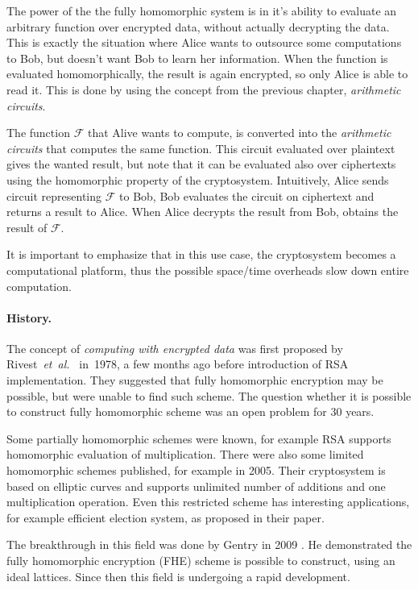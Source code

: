 \documentclass[11pt,oneside,final]{fithesis2}
\newcommand{\eal}{\emph{et~al.}}
\begin{document}
    The power of the the fully homomorphic system is in it's ability to evaluate an arbitrary function over 
    encrypted data, without actually decrypting the data. This is exactly the situation where Alice wants to outsource some computations
    to Bob, but doesn't want Bob to learn her information. When the function is evaluated homomorphically, the result is again encrypted,
    so only Alice is able to read it. This is done by using the concept from the previous chapter, \emph{arithmetic circuits}.

    The function $\mathcal{F}$ that Alive wants to compute, is converted into the \emph{arithmetic circuits} that computes the same function. This circuit evaluated
    over plaintext gives the wanted result, but note that it can be evaluated also over ciphertexts using the homomorphic property of
    the cryptosystem. Intuitively, Alice sends circuit representing $\mathcal{F}$ to Bob, Bob evaluates the circuit on ciphertext and returns a result to Alice.
    When Alice decrypts the result from Bob, obtains the result of $\mathcal{F}$.

    It is important to emphasize that in this use case, the cryptosystem becomes a computational platform, thus the possible space/time overheads slow down entire computation.
        
    \paragraph*{History.} 

    The concept of \emph{computing with encrypted data} was first proposed by Rivest~\eal~\citep{Rivest1978} in~1978, a few months ago 
    before introduction of RSA implementation. They suggested that fully homomorphic encryption may be possible, but were unable to find 
    such scheme. The question whether it is possible to construct fully homomorphic scheme was an open problem for 30 years.
    
    Some partially homomorphic schemes were known, for example RSA supports homomorphic evaluation of multiplication. 
    There were also some limited homomorphic schemes published, for example \citep{Boneh:2005:EFC:2140004.2140029} in 2005. 
    Their cryptosystem is based on elliptic curves and supports unlimited number of additions and one multiplication operation. Even this restricted 
    scheme has interesting applications, for example efficient election system, as proposed in their paper.
    
    The breakthrough in this field was done by Gentry in 2009 \citep{Gentry:2009:FHE:1536414.1536440}. He demonstrated the fully 
    homomorphic encryption (FHE) scheme is possible to construct, using an ideal lattices. Since then this field is undergoing a rapid development.
    
\end{document}

